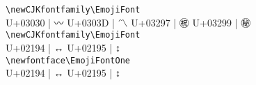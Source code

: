 \documentclass{ctexbook}
\begin{document}
\verb!\newCJKfontfamily\EmojiFont! \\
U+03030 | {\EmojiFont 〰}
U+0303D | {\EmojiFont 〽}
U+03297 | {\EmojiFont ㊗}
U+03299 | {\EmojiFont ㊙} \\


\verb!\newCJKfontfamily\EmojiFont! \\
U+02194 | {\EmojiFont ↔} 
U+02195 | {\EmojiFont ↕} \\

\verb!\newfontface\EmojiFontOne! \\
U+02194 | {\EmojiFontOne ↔} 
U+02195 | {\EmojiFontOne ↕} \\
\end{document}
